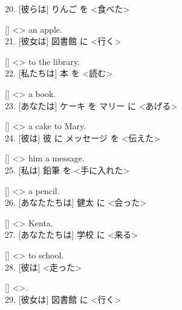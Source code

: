 \documentclass[uplatex,
paper=a4,
fontsize=18pt,
jafontsize=16pt,
number_of_lines=30,
line_length=30zh,
baselineskip=25pt,
]{jlreq}
\begin{document}
20.  [彼らは] りんご を <食べた>

  [\hspace{3em}] <\hspace{3em}> an apple.
\\

21.  [彼女は] 図書館 に <行く>

  [\hspace{3em}] <\hspace{3em}> to the library.
\\

22.  [私たちは] 本 を <読む>

  [\hspace{3em}] <\hspace{3em}> a book.
\\

23.  [あなたは] ケーキ を マリー に <あげる>

  [\hspace{3em}] <\hspace{3em}> a cake to Mary.
\\

24.  [彼は] 彼 に メッセージ を <伝えた>

  [\hspace{3em}] <\hspace{3em}> him a message.
\\

25.  [私は] 鉛筆 を <手に入れた>

  [\hspace{3em}] <\hspace{3em}> a pencil.
\\

26.  [あなたたちは] 健太 に <会った>

  [\hspace{3em}] <\hspace{3em}> Kenta.
\\

27.  [あなたたちは] 学校 に <来る>

  [\hspace{3em}] <\hspace{3em}> to school.
\\

28.  [彼は] <走った>

  [\hspace{3em}] <\hspace{3em}>.
\\

29.  [彼女は] 図書館 に <行く>
\end{document}

